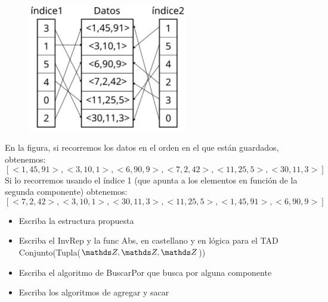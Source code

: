 \begin{figure}[h!]
	\includegraphics[width=7cm]{./indices.png}
\end{figure}

En la figura, si recorremos los datos en el orden en el que están guardados, obtenemos:
\[[<1,45,91>,<3,10,1>,<6,90,9>,<7,2,42>,<11,25,5>,<30,11,3>]\]
Si lo recorremos usando el índice 1 (que apunta a los elementos en función de la segunda componente) obtenemos:
\[[<7,2,42>,<3,10,1>,<30,11,3>,<11,25,5>,<1,45,91>,<6,90,9>]\]

\begin{itemize}
	\item Escriba la estructura propuesta
	\item Escriba el InvRep y la func Abs, en castellano y en lógica para el TAD Conjunto(Tupla($\ent,\ent,\ent$))
	\item Escriba el algoritmo de BuscarPor que busca por alguna componente
	\item Escriba los algoritmos de agregar y sacar
\end{itemize}

